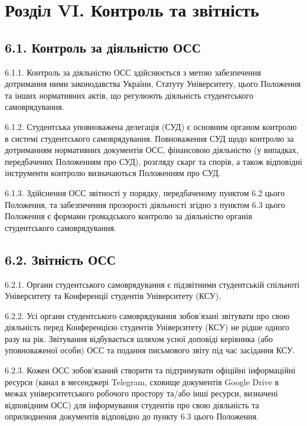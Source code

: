 \section*{Розділ VI. Контроль та звітність}

\subsection*{6.1. Контроль за діяльністю ОСС}
    6.1.1. Контроль за діяльністю ОСС здійснюється з метою забезпечення дотримання ними законодавства України, Статуту Університету, цього Положення та інших нормативних актів, що регулюють діяльність студентського самоврядування.

    6.1.2. Студентська уповноважена делегація (СУД) є основним органом контролю в системі студентського самоврядування. Повноваження СУД щодо контролю за дотриманням нормативних документів ОСС, фінансовою діяльністю (у випадках, передбачених Положенням про СУД), розгляду скарг та спорів, а також відповідні інструменти контролю визначаються Положенням про СУД.

    6.1.3. Здійснення ОСС звітності у порядку, передбаченому пунктом 6.2 цього Положення, та забезпечення прозорості діяльності згідно з пунктом 6.3 цього Положення є формами громадського контролю за діяльністю органів студентського самоврядування.

\subsection*{6.2. Звітність ОСС}
    6.2.1. Органи студентського самоврядування є підзвітними студентській спільноті Університету та Конференції студентів Університету (КСУ).

    6.2.2. Усі органи студентського самоврядування зобов'язані звітувати про свою діяльність перед Конференцією студентів Університету (КСУ) не рідше одного разу на рік. Звітування відбувається шляхом усної доповіді керівника (або уповноваженої особи) ОСС та подання письмового звіту під час засідання КСУ.

    6.2.3. Кожен ОСС зобов'язаний створити та підтримувати офіційні інформаційні ресурси (канал в месенджері Telegram, сховище документів Google Drive в межах університетського робочого простору та/або інші ресурси, визначені відповідним ОСС) для інформування студентів про свою діяльність та оприлюднення документів відповідно до пункту 6.3 цього Положення.

